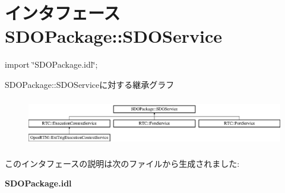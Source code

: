 \section{インタフェース SDOPackage::SDOService}
\label{interfaceSDOPackage_1_1SDOService}


{\ttfamily import \char`\"{}SDOPackage.idl\char`\"{};}

SDOPackage::SDOServiceに対する継承グラフ\begin{figure}[H]
\begin{center}
\leavevmode
\includegraphics[height=2.12928cm]{interfaceSDOPackage_1_1SDOService}
\end{center}
\end{figure}


このインタフェースの説明は次のファイルから生成されました:\begin{DoxyCompactItemize}
\item 
{\bf SDOPackage.idl}\end{DoxyCompactItemize}
